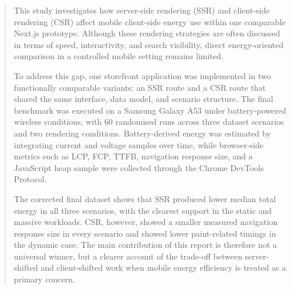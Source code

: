 \begin{abstract}
This study investigates how server-side rendering (SSR) and client-side rendering (CSR) affect mobile client-side energy use within one comparable Next.js prototype. Although these rendering strategies are often discussed in terms of speed, interactivity, and search visibility, direct energy-oriented comparison in a controlled mobile setting remains limited.

To address this gap, one storefront application was implemented in two functionally comparable variants: an SSR route and a CSR route that shared the same interface, data model, and scenario structure. The final benchmark was executed on a Samsung Galaxy A53 under battery-powered wireless conditions, with 60 randomised runs across three dataset scenarios and two rendering conditions. Battery-derived energy was estimated by integrating current and voltage samples over time, while browser-side metrics such as LCP, FCP, TTFB, navigation response size, and a JavaScript heap sample were collected through the Chrome DevTools Protocol.

The corrected final dataset shows that SSR produced lower median total energy in all three scenarios, with the clearest support in the static and massive workloads. CSR, however, showed a smaller measured navigation response size in every scenario and showed lower paint-related timings in the dynamic case. The main contribution of this report is therefore not a universal winner, but a clearer account of the trade-off between server-shifted and client-shifted work when mobile energy efficiency is treated as a primary concern.

\end{abstract}
